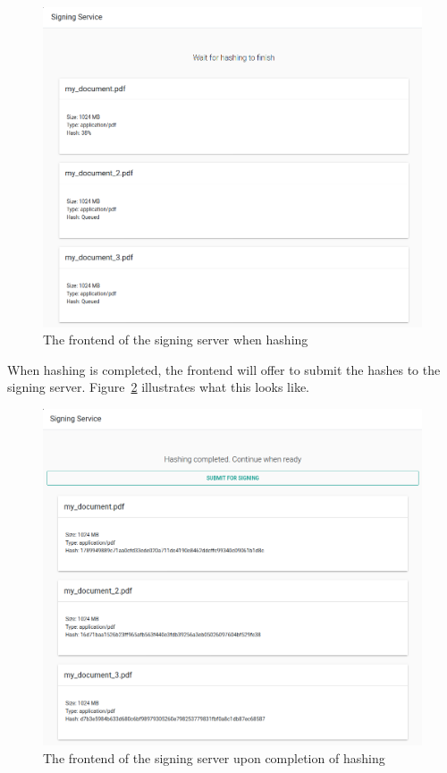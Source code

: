 \begin{figure}[H]
    \begin{center}
        \includegraphics[width=\linewidth]{images/userguide_sign_2.png}
    \end{center}
    \caption{The frontend of the signing server when hashing}
    \label{fig:userguide2}
\end{figure}

When hashing is completed, the frontend will offer to submit the hashes to the signing server.
Figure~\ref{fig:userguide3} illustrates what this looks like.

\begin{figure}[H]
    \begin{center}
        \includegraphics[width=\linewidth]{images/userguide_sign_3.png}
    \end{center}
    \caption{The frontend of the signing server upon completion of hashing}
    \label{fig:userguide3}
\end{figure}

